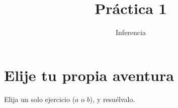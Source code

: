 \documentclass[a4paper,10pt]{article}
\title{Práctica 1}
\author{Inferencia}
\begin{document}
\maketitle
% 


\section*{Elije tu propia aventura}

Elija un solo ejercicio ($a$ o $b$), y resu\'elvalo.
\end{document}

